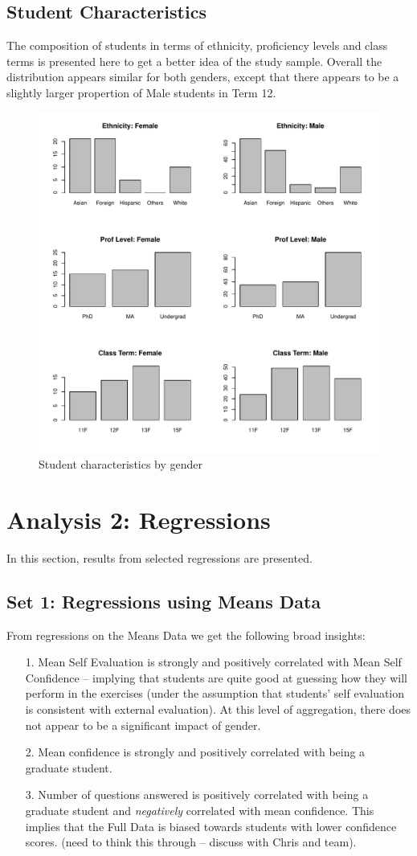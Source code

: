 \documentclass[11pt]{article} %
\begin{document}
\subsection{Student Characteristics}
The composition of students in terms of ethnicity, proficiency levels and class terms is presented here to get a better idea of the study sample. Overall the distribution appears similar for both genders, except that there appears to be a slightly larger propertion of Male students in Term 12. 

\begin{figure}[H]
\centering
\caption{Student characteristics by gender}
\includegraphics[width = 0.75 \textwidth]{comparison5.pdf}
\end{figure}




\section{Analysis 2: Regressions}
In this section, results from selected regressions are presented. 

\subsection{Set 1: Regressions using Means Data}
From regressions on the Means Data we get the following broad insights:
\begin{itemize}
\item[1.] Mean Self Evaluation is strongly and positively correlated with Mean Self Confidence -- implying that students are quite good at guessing how they will perform in the exercises (under the assumption that students' self evaluation is consistent with external evaluation). At this level of aggregation, there does not appear to be a significant impact of gender.
\item[2.] Mean confidence is strongly and positively correlated with being a graduate student. 
\item[3.] Number of questions answered is positively correlated with being a graduate student and \textit{negatively} correlated with mean confidence. This implies that the Full Data is biased towards students with lower confidence scores. (need to think this through -- discuss with Chris and team).
\end{itemize}
\end{document}
